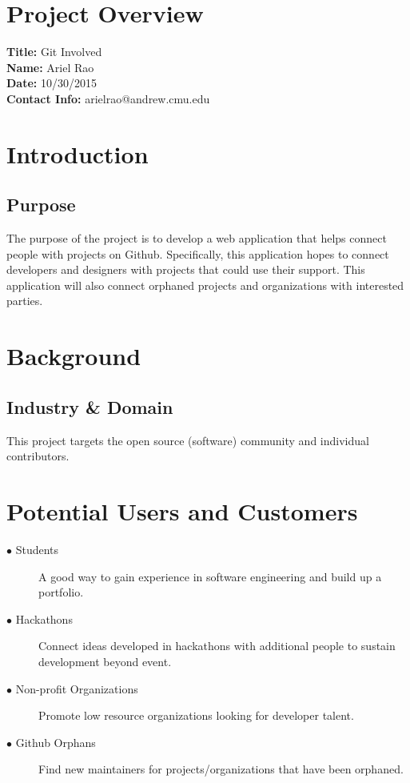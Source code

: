 \documentclass[11pt]{article}
\begin{document}
\section{Project Overview}
\textbf{Title:} Git Involved\\
\textbf{Name:} Ariel Rao\\
\textbf{Date:} 10/30/2015\\
\textbf{Contact Info:} arielrao@andrew.cmu.edu

\section{Introduction}
\subsection{Purpose}
The purpose of the project is to develop a web application that helps connect people with projects on Github. Specifically, this application hopes to connect developers and designers with projects that could use their support. This application will also connect orphaned projects and organizations with interested parties.

\tableofcontents{}
\newpage

\section{Background}
\subsection{Industry \& Domain}
This project targets the open source (software) community and individual contributors. 

\section{Potential Users and Customers}
\begin{description}
\item [$\bullet$ Students] A good way to gain experience in software engineering and build up a portfolio.
\item [$\bullet$ Hackathons] Connect ideas developed in hackathons with additional people to sustain development beyond event.
\item [$\bullet$ Non-profit Organizations] Promote low resource organizations looking for developer talent.
\item [$\bullet$ Github Orphans] Find new maintainers for projects/organizations that have been orphaned.
\end{description}
\end{document}
